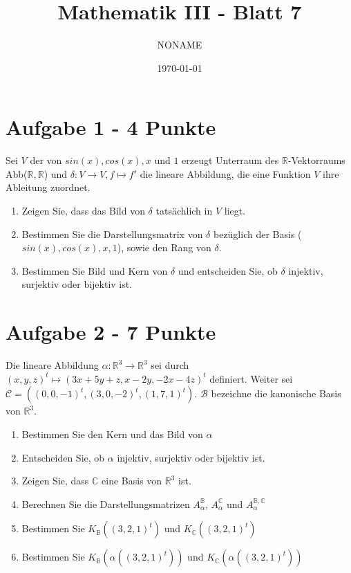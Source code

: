 \documentclass[a4paper]{article}
\author{NONAME}
\title{\vspace{-2cm}Mathematik III - Blatt 7}
\date{\today{}}
\begin{document}
        
\maketitle

\section*{Aufgabe 1 - 4 Punkte}
Sei $V$ der von $sin(x),cos(x),x$ und $1$ erzeugt Unterraum des $\mathbb{R}$-Vektorraums Abb($\mathbb{R},\mathbb{R}$) und $\delta: V \rightarrow V, f \mapsto f'$ die lineare Abbildung, die eine Funktion $V$ ihre Ableitung zuordnet.

   \begin{enumerate}[label=(\alph*)]
\item Zeigen Sie, dass das Bild von $\delta$ tatsächlich in $V$ liegt.
    \item Bestimmen Sie die Darstellungsmatrix von $\delta$ bezüglich der Basis ($sin(x),cos(x),x,1$), sowie den Rang von $\delta$.
    \item Bestimmen Sie Bild und Kern von $\delta$ und entscheiden Sie, ob $\delta$ injektiv, surjektiv oder bijektiv ist.
 \end{enumerate}
 

\section*{Aufgabe 2 - 7 Punkte}
Die lineare Abbildung $\alpha: \mathbb{R}^3 \rightarrow \mathbb{R}^3$ sei durch $(x,y,z)^t \mapsto (3x + 5y + z, x-2y, -2x-4z)^t$ definiert. Weiter sei $\mathcal{C} = ((0,0,-1)^t, (3,0,-2)^t, (1,7,1)^t)$. $\mathcal{B}$ bezeichne die kanonische Basis von $\mathbb{R}^3$.

  \begin{enumerate}[label=(\alph*)]
\item Bestimmen Sie den Kern und das Bild von $\alpha$
    \item Entscheiden Sie, ob $\alpha$ injektiv, surjektiv oder bijektiv ist.
    \item Zeigen Sie, dass $\mathbb{C}$ eine Basis von $\mathbb{R}^3$ ist.
\item Berechnen Sie die Darstellungsmatrizen $A^{\mathbb{B}}_{\alpha}$, $A^{\mathbb{C}}_{\alpha}$ und $A^{\mathbb{B}, \mathbb{C}}_{\alpha}$
    \item Bestimmen Sie $K_{\mathbb{B}} ((3,2,1)^t)$ und $K_{\mathbb{C}} ((3,2,1)^t)$
    \item Bestimmen Sie $K_{\mathbb{B}} (\alpha((3,2,1)^t))$ und $K_{\mathbb{C}} (\alpha((3,2,1)^t))$
 \end{enumerate}
\end{document}
